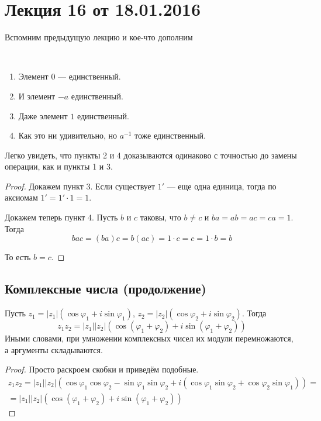 \section{Лекция 16 от 18.01.2016}
Вспомним предыдущую лекцию и кое-что дополним
\begin{Comment}
\ 
\begin{enumerate}
    \item Элемент $0$ --- единственный.
    \item И элемент $-a$ единственный.
    \item Даже элемент $1$ единственный.
    \item Как это ни удивительно, но $a^{-1}$ тоже единственный.
\end{enumerate}
\end{Comment}
Легко увидеть, что пункты 2 и 4 доказываются одинаково с точностью до замены операции, как и пункты 1 и 3.

\begin{proof}
Докажем пункт 3. Если существует $1'$ --- еще одна единица, тогда по аксиомам $1'=1'\cdot1=1$.

Докажем теперь пункт 4. Пусть $b$ и $c$ таковы, что $b \neq c$ и $ba = ab = ac = ca = 1$. Тогда 
\[
bac = \left(ba\right)c = b\left(ac\right) = 1\cdot c = c = 1 \cdot b = b
\]

То есть $b = c$.
\end{proof}

\subsection{Комплексные числа (продолжение)}

\begin{Suggestion}
Пусть $z_1 = |z_1|\left(\cos{\varphi_1}+i\sin{\varphi_1}\right)$, $z_2 = |z_2|\left(\cos{\varphi_2} + i\sin{\varphi_2}\right)$. Тогда 
\[
z_1z_2 = |z_1||z_2|\left(\cos\left(\varphi_1 + \varphi_2\right) + i\sin\left(\varphi_1 + \varphi_2\right)\right)
\]
Иными словами, при умножении комплексных чисел их модули перемножаются, а аргументы складываются.
\end{Suggestion}

\begin{proof}
Просто раскроем скобки и приведём подобные.
\begin{gather*}
z_1z_2 = |z_1||z_2|\left(\cos\varphi_1\cos\varphi_2-\sin\varphi_1\sin\varphi_2 + i\left(\cos\varphi_1\sin\varphi_2+\cos\varphi_2\sin\varphi_1\right)\right) = \\ =|z_1||z_2|\left(\cos\left(\varphi_1 + \varphi_2\right) + i\sin\left(\varphi_1 + \varphi_2\right)\right)
\end{gather*}
\end{proof}

